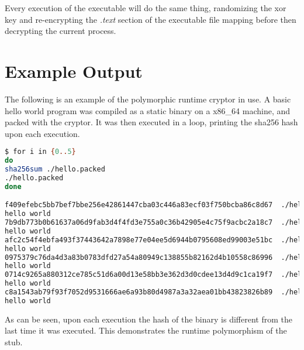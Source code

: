 \documentclass[a4paper, 11pt]{article} %
\begin{document}
Every execution of the executable will do the same thing, randomizing the xor key and re-encrypting the \textit{.text} section of the executable file mapping before then decrypting the current process.

\section*{Example Output}

The following is an example of the polymorphic runtime cryptor in use. A basic hello world program was compiled as a static binary on a x86\_64 machine, and packed with the cryptor. It was then executed in a loop, printing the sha256 hash upon each execution.
\hfill
\begin{lstlisting}[language=Bash]
$ for i in {0..5}
do
sha256sum ./hello.packed
./hello.packed
done

f409efebc5bb7bef7bbe256e42861447cba03c446a83ecf03f750bcba86c8d67  ./hello.packed
hello world
7b9db773b0b61637a06d9fab3d4f4fd3e755a0c36b42905e4c75f9acbc2a18c7  ./hello.packed
hello world
afc2c54f4ebfa493f37443642a7898e77e04ee5d6944b0795608ed99003e51bc  ./hello.packed
hello world
0975379c76da4d3a83b0783dfd27a54a80949c138855b82162d4b10558c86996  ./hello.packed
hello world
0714c9265a880312ce785c51d6a00d13e58bb3e362d3d0cdee13d4d9c1ca19f7  ./hello.packed
hello world
c8a1543ab79f93f7052d9531666ae6a93b80d4987a3a32aea01bb43823826b89  ./hello.packed
hello world
\end{lstlisting}
\hfill
As can be seen, upon each execution the hash of the binary is different from the last time it was executed. This demonstrates the runtime polymorphism of the stub. 


%


%
%
%

\end{document}
